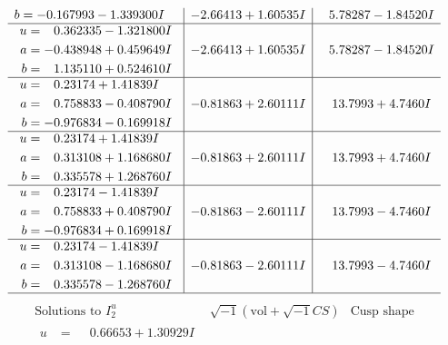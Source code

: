 \documentclass[1p]{elsarticle_modified}
\theoremstyle{definition}
\newcommand{\I}{\sqrt{-1}}
\begin{document}
$$\begin{array}{c|c|c}
\begin{aligned}
b &= -0.167993 - 1.339300 I\end{aligned}
 & -2.66413 + 1.60535 I & \phantom{-}5.78287 - 1.84520 I \\ \hline\begin{aligned}
u &= \phantom{-}0.362335 - 1.321800 I \\
a &= -0.438948 + 0.459649 I \\
b &= \phantom{-}1.135110 + 0.524610 I\end{aligned}
 & -2.66413 + 1.60535 I & \phantom{-}5.78287 - 1.84520 I \\ \hline\begin{aligned}
u &= \phantom{-}0.23174 + 1.41839 I \\
a &= \phantom{-}0.758833 - 0.408790 I \\
b &= -0.976834 - 0.169918 I\end{aligned}
 & -0.81863 + 2.60111 I & \phantom{-}13.7993 + 4.7460 I \\ \hline\begin{aligned}
u &= \phantom{-}0.23174 + 1.41839 I \\
a &= \phantom{-}0.313108 + 1.168680 I \\
b &= \phantom{-}0.335578 + 1.268760 I\end{aligned}
 & -0.81863 + 2.60111 I & \phantom{-}13.7993 + 4.7460 I \\ \hline\begin{aligned}
u &= \phantom{-}0.23174 - 1.41839 I \\
a &= \phantom{-}0.758833 + 0.408790 I \\
b &= -0.976834 + 0.169918 I\end{aligned}
 & -0.81863 - 2.60111 I & \phantom{-}13.7993 - 4.7460 I \\ \hline\begin{aligned}
u &= \phantom{-}0.23174 - 1.41839 I \\
a &= \phantom{-}0.313108 - 1.168680 I \\
b &= \phantom{-}0.335578 - 1.268760 I\end{aligned}
 & -0.81863 - 2.60111 I & \phantom{-}13.7993 - 4.7460 I\\
 \hline 
 \end{array}$$\newpage$$\begin{array}{c|c|c}  
\text{Solutions to }I^u_{2}& \I (\text{vol} + \sqrt{-1}CS) & \text{Cusp shape}\\
 \hline 
\begin{aligned}
u &= \phantom{-}0.66653 + 1.30929 I \\

\end{aligned}
\end{array}$$
\end{document}

